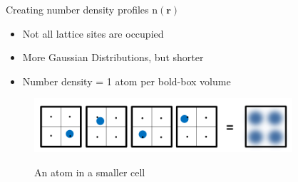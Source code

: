 \documentclass{beamer}
\renewcommand{\vec}[1]{\mathbf{#1}}
\begin{document}
       
    

\begin{frame}{Creating number density profiles $\text{n}(\vec r)$}
    \begin{itemize}
	    \item Not all lattice sites are occupied
		\item More Gaussian Distributions, but shorter
		\item Number density = 1 atom per bold-box volume
	\end{itemize}	

    \begin{figure}
       \centering
       \includegraphics[height=2cm]{Ensemble_Smallcells.png}
       \label{fig:Ensemble_Smallcells}
       
       An atom in a smaller cell
    \end{figure}     
\end{frame}

\end{document}
